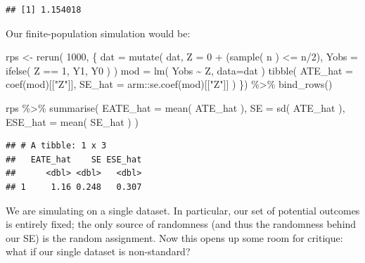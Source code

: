 \documentclass[
]{book}
\newenvironment{Shaded}{\begin{snugshade}}{\end{snugshade}}
\newcommand{\AttributeTok}[1]{\textcolor[rgb]{0.77,0.63,0.00}{#1}}
\newcommand{\DecValTok}[1]{\textcolor[rgb]{0.00,0.00,0.81}{#1}}
\newcommand{\FunctionTok}[1]{\textcolor[rgb]{0.00,0.00,0.00}{#1}}
\newcommand{\NormalTok}[1]{#1}
\newcommand{\OtherTok}[1]{\textcolor[rgb]{0.56,0.35,0.01}{#1}}
\newcommand{\SpecialCharTok}[1]{\textcolor[rgb]{0.00,0.00,0.00}{#1}}
\newcommand{\StringTok}[1]{\textcolor[rgb]{0.31,0.60,0.02}{#1}}
\begin{document}
\begin{Shaded}
\end{Shaded}

\begin{verbatim}
## [1] 1.154018
\end{verbatim}

Our finite-population simulation would be:

\begin{Shaded}
\begin{Highlighting}[]
\NormalTok{rps }\OtherTok{\textless{}{-}} \FunctionTok{rerun}\NormalTok{( }\DecValTok{1000}\NormalTok{, \{}
\NormalTok{  dat }\OtherTok{=} \FunctionTok{mutate}\NormalTok{( dat,}
              \AttributeTok{Z =} \DecValTok{0} \SpecialCharTok{+}\NormalTok{ (}\FunctionTok{sample}\NormalTok{( n ) }\SpecialCharTok{\textless{}=}\NormalTok{ n}\SpecialCharTok{/}\DecValTok{2}\NormalTok{),}
              \AttributeTok{Yobs =} \FunctionTok{ifelse}\NormalTok{( Z }\SpecialCharTok{==} \DecValTok{1}\NormalTok{, Y1, Y0 ) )}
\NormalTok{  mod }\OtherTok{=} \FunctionTok{lm}\NormalTok{( Yobs }\SpecialCharTok{\textasciitilde{}}\NormalTok{ Z, }\AttributeTok{data=}\NormalTok{dat )}
  \FunctionTok{tibble}\NormalTok{( }\AttributeTok{ATE\_hat =} \FunctionTok{coef}\NormalTok{(mod)[[}\StringTok{"Z"}\NormalTok{]],}
          \AttributeTok{SE\_hat =}\NormalTok{ arm}\SpecialCharTok{::}\FunctionTok{se.coef}\NormalTok{(mod)[[}\StringTok{"Z"}\NormalTok{]] )}
\NormalTok{  \}) }\SpecialCharTok{\%\textgreater{}\%}
  \FunctionTok{bind\_rows}\NormalTok{()}

\NormalTok{rps }\SpecialCharTok{\%\textgreater{}\%} \FunctionTok{summarise}\NormalTok{( }\AttributeTok{EATE\_hat =} \FunctionTok{mean}\NormalTok{( ATE\_hat ),}
                   \AttributeTok{SE =} \FunctionTok{sd}\NormalTok{( ATE\_hat ),}
                   \AttributeTok{ESE\_hat =} \FunctionTok{mean}\NormalTok{( SE\_hat ) )}
\end{Highlighting}
\end{Shaded}

\begin{verbatim}
## # A tibble: 1 x 3
##   EATE_hat    SE ESE_hat
##      <dbl> <dbl>   <dbl>
## 1     1.16 0.248   0.307
\end{verbatim}

We are simulating on a single dataset.
In particular, our set of potential outcomes is entirely fixed; the only source of randomness (and thus the randomness behind our SE) is the random assignment.
Now this opens up some room for critique: what if our single dataset is non-standard?
\end{document}
